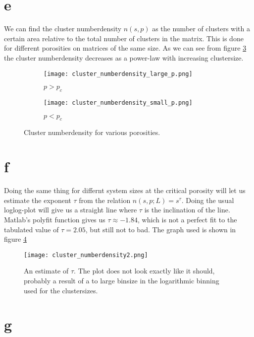 \documentclass[a4paper,english, 10pt, twoside]{article}
\begin{document}
\section*{e}

We can find the cluster numberdensity $n(s,p)$ as the number of clusters with a certain area relative to the 
total number of clusters in the matrix. This is done for different porosities on matrices of the same size. As 
we can see from figure \ref{clustersize} the cluster numberdensity decreases as a power-law with increasing clustersize.
\begin{figure}[H]
\centering
  \begin{subfigure}[b]{0.48\textwidth}
    \texttt{[image: cluster\_numberdensity\_large\_p.png]}
    \caption{$p > p_c$}
    \label{clustersize:larger}
  \end{subfigure}
  \begin{subfigure}[b]{0.48\textwidth}
    \texttt{[image: cluster\_numberdensity\_small\_p.png]}
    \label{clustersize:smaller}
    \caption{$p < p_c$}
  \end{subfigure} 
  \caption{Cluster numberdensity for various porosities.}
  \label{clustersize}
\end{figure}

\section*{f}\label{sect_f}

Doing the same thing for differnt system sizes at the critical porosity will let us estimate the exponent $\tau$ from 
the relation $n(s,p;L) = s^\tau$. Doing the usual loglog-plot will give us a straight line where $\tau$ is the 
inclination of the line. Matlab's polyfit function gives us $\tau \approx -1.84$, which is not a perfect fit to the 
tabulated value of $\tau = 2.05$, but still not to bad. The graph used is shown in figure \ref{tau}

\begin{figure}[H]
 \centering
 \texttt{[image: cluster\_numberdensity2.png]}
 \caption{An estimate of $\tau$. The plot does not look exactly like it should, probably a result of a 
 to large binsize in the logarithmic binning used for the clustersizes.}
 \label{tau}
\end{figure}

\section*{g}
\end{document}
